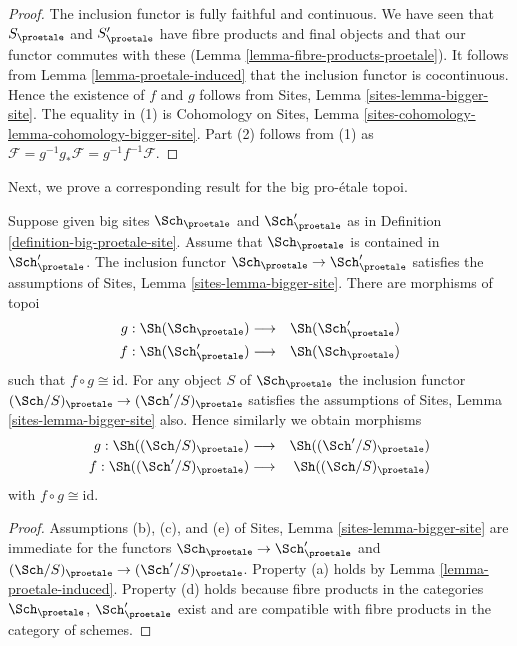 \begin{proof}
The inclusion functor is fully faithful and continuous.
We have seen that $S_\proetale$ and $S_\proetale'$ have fibre products
and final objects and that our functor commutes with these
(Lemma \ref{lemma-fibre-products-proetale}).
It follows from Lemma \ref{lemma-proetale-induced}
that the inclusion functor is cocontinuous.
Hence the existence of $f$ and $g$ follows from
Sites, Lemma \ref{sites-lemma-bigger-site}.
The equality in (1) is
Cohomology on Sites, Lemma \ref{sites-cohomology-lemma-cohomology-bigger-site}.
Part (2) follows from (1) as
$\mathcal{F} = g^{-1}g_*\mathcal{F} = g^{-1}f^{-1}\mathcal{F}$.
\end{proof}

\noindent
Next, we prove a corresponding result for the big pro-\'etale topoi.

\begin{lemma}
\label{lemma-change-alpha}
Suppose given big sites $\Sch_\proetale$ and $\Sch'_\proetale$ as in
Definition \ref{definition-big-proetale-site}.
Assume that $\Sch_\proetale$ is contained in $\Sch'_\proetale$.
The inclusion functor $\Sch_\proetale \to \Sch'_\proetale$ satisfies
the assumptions of Sites, Lemma \ref{sites-lemma-bigger-site}.
There are morphisms of topoi
\begin{eqnarray*}
g : \Sh(\Sch_\proetale) &
\longrightarrow &
\Sh(\Sch'_\proetale) \\
f : \Sh(\Sch'_\proetale) &
\longrightarrow &
\Sh(\Sch_\proetale)
\end{eqnarray*}
such that $f \circ g \cong \text{id}$. For any object $S$
of $\Sch_\proetale$ the inclusion functor
$(\Sch/S)_\proetale \to (\Sch'/S)_\proetale$ satisfies
the assumptions of Sites, Lemma \ref{sites-lemma-bigger-site}
also. Hence similarly we obtain morphisms
\begin{eqnarray*}
g : \Sh((\Sch/S)_\proetale) &
\longrightarrow &
\Sh((\Sch'/S)_\proetale) \\
f : \Sh((\Sch'/S)_\proetale) &
\longrightarrow &
\Sh((\Sch/S)_\proetale)
\end{eqnarray*}
with $f \circ g \cong \text{id}$.
\end{lemma}

\begin{proof}
Assumptions (b), (c), and (e) of
Sites, Lemma \ref{sites-lemma-bigger-site}
are immediate for the functors
$\Sch_\proetale \to \Sch'_\proetale$ and
$(\Sch/S)_\proetale \to (\Sch'/S)_\proetale$. Property (a) holds by
Lemma \ref{lemma-proetale-induced}.
Property (d) holds because
fibre products in the categories $\Sch_\proetale$, $\Sch'_\proetale$
exist and are compatible with fibre products in the category of schemes.
\end{proof}

